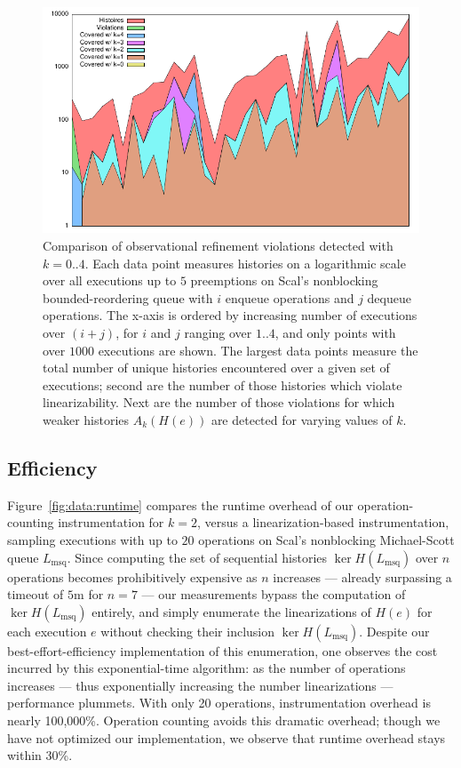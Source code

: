 \begin{figure}
  \centering
  \includegraphics[width=\linewidth]{figures/coverage-bkq-2-barriers}
  \caption{Comparison of observational refinement violations detected with
    $k = 0..4$.
    Each data point measures histories on a logarithmic scale over all
    executions up to $5$ preemptions on Scal's nonblocking bounded-reordering
    queue with $i$ enqueue operations and $j$ dequeue operations.
    The x-axis is ordered by increasing number of executions over $(i+j)$,
    for $i$ and $j$ ranging over $1..4$, and only points with over $1000$
    executions are shown.
    The largest data points measure the total number of unique histories
    encountered over a given set of executions; second are the number of
    those histories which violate linearizability. Next are the number of
    those violations for which weaker histories $A_k(H(e))$ are detected
    for varying values of $k$.
  }
  \label{fig:data:coverage}
\end{figure}

\subsection{Efficiency}

Figure~\ref{fig:data:runtime} compares the runtime overhead of our
operation-counting instrumentation for $k=2$, versus a linearization-based
instrumentation, sampling executions with up to $20$ operations on Scal's
nonblocking Michael-Scott queue $L_\mathrm{msq}$. Since computing the set of
sequential histories $\ker H(L_\mathrm{msq})$ over $n$ operations becomes
prohibitively expensive as $n$ increases --- already surpassing a timeout of
$5$m for $n=7$ --- our measurements bypass the computation of $\ker
H(L_\mathrm{msq})$ entirely, and simply enumerate the linearizations of $H(e)$
for each execution $e$ without checking their inclusion $\ker
H(L_\mathrm{msq})$. Despite our best-effort-efficiency implementation of this
enumeration, one observes the cost incurred by this exponential-time algorithm:
as the number of operations increases --- thus exponentially increasing the
number linearizations --- performance plummets. With only 20 operations,
instrumentation overhead is nearly 100,000\%. Operation counting avoids this
dramatic overhead; though we have not optimized our implementation, we observe
that runtime overhead stays within 30\%.

